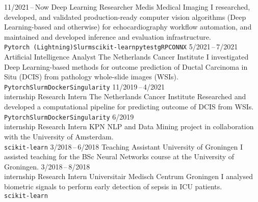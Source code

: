 \documentclass[9pt]{developercv}
\begin{document}
\vspace{.5cm}


\begin{entrylist}
\entry
    {11/2021\,--\,Now}
    {Deep Learning Researcher}
    {Medis Medical Imaging}
    {I researched, developed, and validated production-ready computer vision algorithms (Deep Learning-based and otherwise) for echocardiography workflow automation, and maintained and developed inference and evaluation infrastructure.\\
    \texttt{Pytorch (Lightning)}\slashsepb\texttt{Slurm}\slashsepb\texttt{scikit-learn}\slashsepb\texttt{pytest}\slashsepb\texttt{gRPC}\slashsepb\texttt{ONNX}}
\entry
    {5/2021\,--\,7/2021}
    {Artificial Intelligence Analyst}
    {The Netherlands Cancer Institute}
    {I investigated Deep Learning-based methods for outcome prediction of Ductal Carcinoma in Situ (DCIS) from pathology whole-slide images (WSIs).\\
    \texttt{Pytorch}\slashsepb\texttt{Slurm}\slashsepb\texttt{Docker}\slashsepb\texttt{Singularity}}
\entry
    {11/2019\,--\,4/2021\\\footnotesize{internship}}
    {Research Intern}
    {The Netherlands Cancer Institute}
    {Researched and developed a computational pipeline for predicting outcome of DCIS from WSIs.\\
    \texttt{Pytorch}\slashsepb\texttt{Slurm}\slashsepb\texttt{Docker}\slashsepb\texttt{Singularity}}
\entry
    {6/2019\\\footnotesize{internship}}
    {Research Intern}
    {KPN}
    {NLP and Data Mining project in collaboration with the University of Amsterdam.\\
    \texttt{scikit-learn}}
\entry
    {3/2018\,--\,6/2018}
    {Teaching Assistant}
    {University of Groningen}
    {I assisted teaching for the BSc Neural Networks course at the University of Groningen.}
\entry
    {3/2018\,--\,8/2018\\\footnotesize{internship}}
    {Research Intern}
    {Universitair Medisch Centrum Groningen}
    {I analysed biometric signals to perform early detection of sepsis in ICU patients.\\
    \texttt{scikit-learn}}
\end{entrylist}


\end{document}
